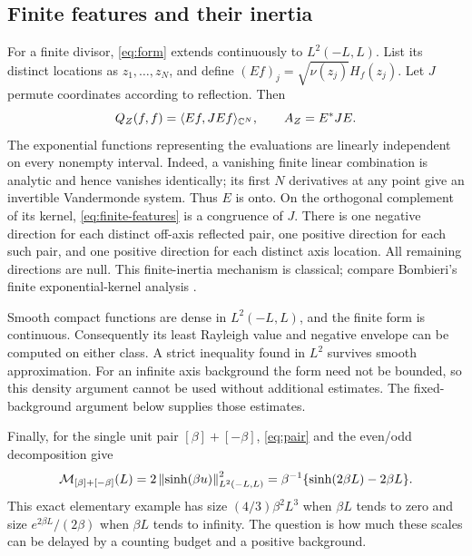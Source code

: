 \subsection{Finite features and their inertia}
For a finite divisor, \eqref{eq:form} extends continuously to
\(L^2(-L,L)\). List its distinct locations as \(z_1,\ldots,z_N\),
and define \((Ef)_j=\sqrt{\nu(z_j)}H_f(z_j)\).
Let \(J\) permute coordinates according to reflection. Then
\begin{equation}\label{eq:finite-features}
 Q_Z(f,f)=\langle Ef,JEf\rangle_{\mathbb C^N},\qquad
 A_Z=E^*JE.
\end{equation}
The exponential functions representing the evaluations are linearly
independent on every nonempty interval. Indeed, a vanishing finite
linear combination is analytic and hence vanishes identically;
its first \(N\) derivatives at any point give an invertible
Vandermonde system. Thus \(E\) is onto. On the orthogonal complement
of its kernel, \eqref{eq:finite-features} is a congruence of \(J\).
There is one negative direction for each distinct off-axis reflected
pair, one positive direction for each such pair, and one positive
direction for each distinct axis location. All remaining directions
are null. This finite-inertia mechanism is classical; compare
Bombieri's finite exponential-kernel analysis \cite[Sections 8--9]{Bombieri}.

Smooth compact functions are dense in \(L^2(-L,L)\), and the
finite form is continuous. Consequently its least Rayleigh value
and negative envelope can be computed on either class. A strict
inequality found in \(L^2\) survives smooth approximation. For an
infinite axis background the form need not be bounded, so this
density argument cannot be used without additional estimates.
The fixed-background argument below supplies those estimates.

Finally, for the single unit pair \([\beta]+[-\beta]\),
\eqref{eq:pair} and the even/odd decomposition give
\begin{equation}\label{eq:single-pair}
 \mathcal M_{[\beta]+[-\beta]}(L)
 =2\left\|\sinh(\beta u)\right\|_{L^2(-L,L)}^2
 =\beta^{-1}\{\sinh(2\beta L)-2\beta L\}.
\end{equation}
This exact elementary example has size
\((4/3)\beta^2L^3\) when \(\beta L\) tends to zero and
size \(e^{2\beta L}/(2\beta)\) when \(\beta L\) tends to
infinity. The question is how much these scales can be delayed
by a counting budget and a positive background.

